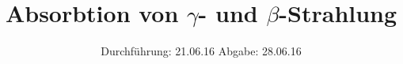 

\subject{Versuch 704}
\title{Absorbtion von \texorpdfstring{$\gamma$}{}- und \texorpdfstring{$\beta$}{}-Strahlung}
\date{
  Durchführung: 21.06.16
  \hspace{3em}
  Abgabe: 28.06.16
}



\maketitle
\thispagestyle{empty}
\tableofcontents
\newpage






\printbibliography


